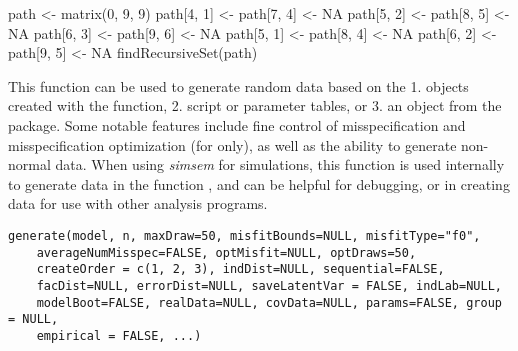 \documentclass[a4paper]{book}
\begin{document}
%
\begin{Examples}
\begin{ExampleCode}
path <- matrix(0, 9, 9)
path[4, 1] <- path[7, 4] <- NA
path[5, 2] <- path[8, 5] <- NA
path[6, 3] <- path[9, 6] <- NA
path[5, 1] <- path[8, 4] <- NA
path[6, 2] <- path[9, 5] <- NA
findRecursiveSet(path)
\end{ExampleCode}
\end{Examples}
%
\begin{Description}\relax
This function can be used to generate random data based on the 1.  objects created with the  function, 2.  script or parameter tables, or 3. an  object from the  package. Some notable features include fine control of misspecification and misspecification optimization (for  only), as well as the ability to generate non-normal data. When using \emph{simsem} for simulations, this function is used internally to generate data in the function , and can be helpful for debugging, or in creating data for use with other analysis programs. 
\end{Description}
%
\begin{Usage}
\begin{verbatim}
generate(model, n, maxDraw=50, misfitBounds=NULL, misfitType="f0",
	averageNumMisspec=FALSE, optMisfit=NULL, optDraws=50, 
	createOrder = c(1, 2, 3), indDist=NULL, sequential=FALSE,	
	facDist=NULL, errorDist=NULL, saveLatentVar = FALSE, indLab=NULL, 
	modelBoot=FALSE, realData=NULL, covData=NULL, params=FALSE, group = NULL, 
	empirical = FALSE, ...)
\end{verbatim}
\end{Usage}
%
\end{document}
